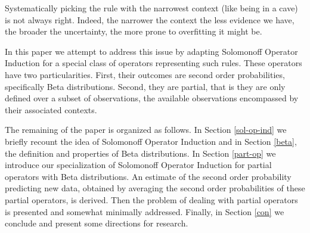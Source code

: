 \documentclass[runningheads]{llncs}
\begin{document}
Systematically picking the rule with the narrowest context (like being
in a cave) is not always right. Indeed, the narrower the context the
less evidence we have, the broader the uncertainty, the more prone to
overfitting it might be.


In this paper we attempt to address this issue by adapting Solomonoff
Operator Induction \cite{Solomonoff08Three} for a special class of
operators representing such rules. These operators have two
particularities. First, their outcomes are second order probabilities,
specifically Beta distributions. Second, they are partial, that is
they are only defined over a subset of observations, the available
observations encompassed by their associated contexts.


The remaining of the paper is organized as follows. In Section
\ref{sol-op-ind} we briefly recount the idea of Solomonoff Operator
Induction and in Section \ref{beta}, the definition and properties of
Beta distributions. In Section \ref{part-op} we introduce our
specialization of Solomonoff Operator Induction for partial operators
with Beta distributions. An estimate of the second order probability
predicting new data, obtained by averaging the second order
probabilities of these partial operators, is derived. Then the problem
of dealing with partial operators is presented and somewhat minimally
addressed. Finally, in Section \ref{con} we conclude and present some
directions for research.
\end{document}
